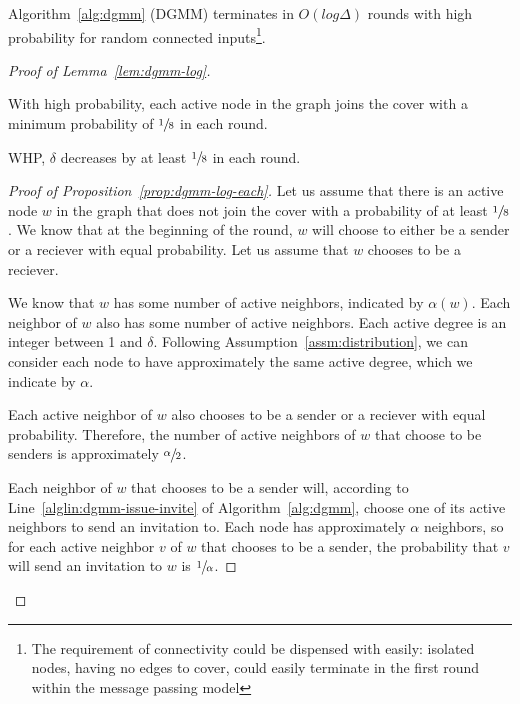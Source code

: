 \begin{lem}
\label{lem:dgmm-log}
Algorithm~\ref{alg:dgmm} (DGMM) terminates in $O(log \Delta)$ rounds with high probability for random connected inputs\footnote{The requirement of connectivity could be dispensed with easily: isolated nodes, having no edges to cover, could easily terminate in the first round within the message passing model}.
\end{lem}




\begin{proof}[Proof of Lemma~\ref{lem:dgmm-log}]
\begin{lprp}
\label{prop:dgmm-log-each}
With high probability, each active node in the graph joins the cover with a minimum probability of $\sfrac{1}{8}$ in each round.
\end{lprp}
\begin{lprp}
\label{prop:dgmm-log-alpha}
WHP, $\delta$ decreases by at least $\sfrac{1}{8}$ in each round.
\end{lprp}
\begin{proof}[Proof of Proposition~\ref{prop:dgmm-log-each}]
Let us assume that there is an active node $w$ in the graph that does not join the cover with a probability of at least $\sfrac{1}{8}$. We know that at the beginning of the round, $w$ will choose to either be a sender or a reciever with equal probability. Let us assume that $w$ chooses to be a reciever.

We know that $w$ has some number of active neighbors, indicated by $\alpha(w)$. Each neighbor of $w$ also has some number of active neighbors. Each active degree is an integer between 1 and $\delta$. Following Assumption~\ref{assm:distribution}, we can consider each node to have approximately the same active degree, which we indicate by $\alpha$. 

Each active neighbor of $w$ also chooses to be a sender or a reciever with equal probability. Therefore, the number of active neighbors of $w$ that choose to be senders is approximately $\sfrac{\alpha}{2}$. 

Each neighbor of $w$ that chooses to be a sender will, according to Line~\ref{alglin:dgmm-issue-invite} of Algorithm~\ref{alg:dgmm}, choose one of its active neighbors to send an invitation to. Each node has approximately $\alpha$ neighbors, so for each active neighbor $v$ of $w$ that chooses to be a sender, the probability that $v$ will send an invitation to $w$ is $\sfrac{1}{\alpha}$.


\end{proof}
\end{proof}
